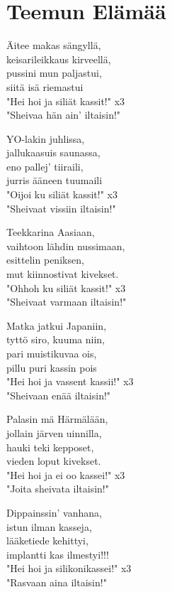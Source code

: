 \section{Teemun Elämää}
Äitee makas sängyllä,\\
keisarileikkaus kirveellä,\\
pussini mun paljastui,\\
siitä isä riemastui\\
"Hei hoi ja siliät kassit!" x3\\
"Sheivaa hän ain' iltaisin!"

YO-lakin juhlissa,\\
jallukaasuis saunassa,\\
eno pallej' tiiraili,\\
jurris ääneen tuumaili\\
"Oijoi ku siliät kassit!" x3\\
"Sheivaat vissiin iltaisin!"

Teekkarina Aasiaan,\\
vaihtoon lähdin nussimaan,\\
esittelin peniksen,\\
mut kiinnostivat kivekset.\\
"Ohhoh ku siliät kassit!" x3\\
"Sheivaat varmaan iltaisin!"

Matka jatkui Japaniin,\\
tyttö siro, kuuma niin,\\
pari muistikuvaa ois,\\
pillu puri kassin pois\\
"Hei hoi ja vassent kassii!" x3\\
"Sheivaan enää iltaisin!"

Palasin mä Härmälään,\\
jollain järven uinnilla,\\
hauki teki kepposet,\\
vieden loput kivekset.\\
"Hei hoi ja ei oo kassei!" x3\\
"Joita sheivata iltaisin!"

Dippainssin' vanhana,\\
istun ilman kasseja,\\
lääketiede kehittyi,\\
implantti kas ilmestyi!!!\\
"Hei hoi ja silikonikassei!" x3\\
"Rasvaan aina iltaisin!"